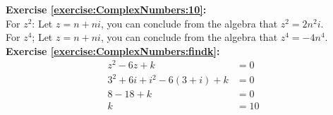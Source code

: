\noindent\textbf{Exercise \ref{exercise:ComplexNumbers:10}:} \\
For $z^{2}$: Let $z = n + ni$, you can conclude from the algebra that $z^{2} = 2n^{2}i$. \\
For $z^{4}$; Let $z = n + ni$, you can conclude from the algebra that $z^{4} = -4n^{4}$. \\

\noindent\textbf{Exercise \ref{exercise:ComplexNumbers:findk}:}
\begin{align*}
z^{2} - 6z + k &= 0\\
3^{2} + 6i + i^{2} - 6(3 + i) + k &= 0\\
8 - 18 + k &= 0\\
k &= 10
\end{align*}

